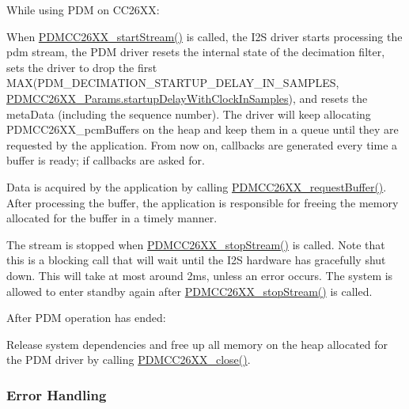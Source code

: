 While using P\+D\+M on C\+C26\+X\+X\+:
\begin{DoxyItemize}
\item When \hyperlink{_p_d_m_c_c26_x_x_8h_af5fafd7c475117bd3ed6783273c2220d}{P\+D\+M\+C\+C26\+X\+X\+\_\+start\+Stream()} is called, the I2\+S driver starts processing the pdm stream, the P\+D\+M driver resets the internal state of the decimation filter, sets the driver to drop the first M\+A\+X(P\+D\+M\+\_\+\+D\+E\+C\+I\+M\+A\+T\+I\+O\+N\+\_\+\+S\+T\+A\+R\+T\+U\+P\+\_\+\+D\+E\+L\+A\+Y\+\_\+\+I\+N\+\_\+\+S\+A\+M\+P\+L\+E\+S, \hyperlink{struct_p_d_m_c_c26_x_x___params_a1ffbb2852a48ff157c0f58df4dce4a3b}{P\+D\+M\+C\+C26\+X\+X\+\_\+\+Params.\+startup\+Delay\+With\+Clock\+In\+Samples}), and resets the meta\+Data (including the sequence number). The driver will keep allocating P\+D\+M\+C\+C26\+X\+X\+\_\+pcm\+Buffers on the heap and keep them in a queue until they are requested by the application. From now on, callbacks are generated every time a buffer is ready; if callbacks are asked for.
\item Data is acquired by the application by calling \hyperlink{_p_d_m_c_c26_x_x_8h_a15a0017513c13ca244f7e3a0f5761e8d}{P\+D\+M\+C\+C26\+X\+X\+\_\+request\+Buffer()}. After processing the buffer, the application is responsible for freeing the memory allocated for the buffer in a timely manner.
\item The stream is stopped when \hyperlink{_p_d_m_c_c26_x_x_8h_aebd3b158f38ba1489a56efe5b9a722d2}{P\+D\+M\+C\+C26\+X\+X\+\_\+stop\+Stream()} is called. Note that this is a blocking call that will wait until the I2\+S hardware has gracefully shut down. This will take at most around 2ms, unless an error occurs. The system is allowed to enter standby again after \hyperlink{_p_d_m_c_c26_x_x_8h_aebd3b158f38ba1489a56efe5b9a722d2}{P\+D\+M\+C\+C26\+X\+X\+\_\+stop\+Stream()} is called.
\end{DoxyItemize}

After P\+D\+M operation has ended\+:
\begin{DoxyItemize}
\item Release system dependencies and free up all memory on the heap allocated for the P\+D\+M driver by calling \hyperlink{_p_d_m_c_c26_x_x_8h_afb9597d25d6b2e02f6903bf6652d4371}{P\+D\+M\+C\+C26\+X\+X\+\_\+close()}.
\end{DoxyItemize}

\subsubsection*{Error Handling}

